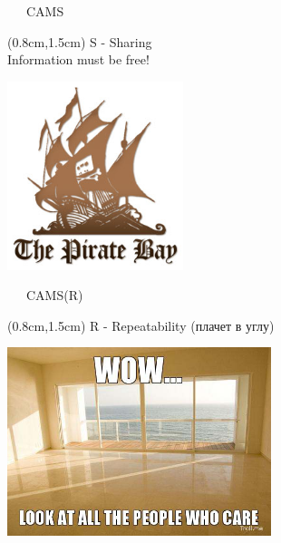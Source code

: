 \documentclass[xetex,18pt,aspectratio=43]{beamer}
\begin{document}
\begin{Large}
\begin{frame}{\ \ \ CAMS}
\begin{textblock*}{\framewidth}(0.8cm,1.5cm)
S - Sharing\\
{\small Information must be free!}
\begin{minipage}{\textwidth}
  \centering
  \includegraphics[height=5.5cm]{img/tpb}
\end{minipage}
\end{textblock*}
\end{frame}

\begin{frame}{\ \ \ CAMS(R)}
\begin{textblock*}{\framewidth}(0.8cm,1.5cm)
R - Repeatability (плачет в углу)\\
{\small \href{https://www.opennet.ru/opennews/art.shtml?num=46338}{\color{blue}{https://www.opennet.ru/opennews/art.shtml?num=46338}}}
\begin{minipage}{\textwidth}
  \centering
  \includegraphics[height=5.5cm]{img/theycare}
\end{minipage}
\end{textblock*}
\end{frame}


\end{Large}
\end{document}

